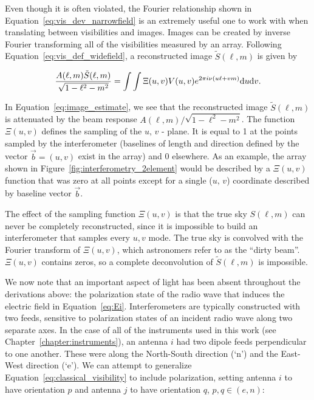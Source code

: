 Even though it is often violated, the Fourier relationship shown in Equation~\ref{eq:vis_dev_narrowfield} is an extremely useful one to work with when translating between visibilities and images. Images can be created by inverse Fourier transforming all of the visibilities measured by an array. Following Equation~\ref{eq:vis_def_widefield}, a reconstructed image $\tilde{S}(\ell, m)$ is given by

\begin{equation}
\frac{A(\ell, m)\tilde{S}(\ell, m)}{\sqrt{1 - \ell^2 - m^2}} = \int\int \Xi(u, v) V(u,v) e^{2\pi i \nu (u\ell + vm)} {\rm d}u {\rm d}v.
\label{eq:image_estimate}
\end{equation}

In Equation~\ref{eq:image_estimate}, we see that the reconstructed image $\tilde{S}(\ell, m)$ is attenuated by the beam response $A(\ell, m)/\sqrt{1 - \ell^2 - m^2}$. The function $\Xi(u, v)$ defines the sampling of the $u,\,v$ - plane. It is equal to 1 at the points sampled by the interferometer (baselines of length and direction defined by the vector  $\vec{b} = (u,v)$ exist in the array) and 0 elsewhere. As an example, the array shown in Figure~\ref{fig:interferometry_2element} would be described by a $\Xi(u, v)$ function that was zero at all points except for a single ($u,\,v$) coordinate described by baseline vector $\vec{b}$.

The effect of the sampling function $\Xi(u, v)$ is that the true sky $S(\ell,m)$ can never be completely reconstructed, since it is impossible to build an interferometer that samples every $u,v$ mode. The true sky is convolved with the Fourier transform of $\Xi(u, v)$, which astronomers refer to as the ``dirty beam''. $\Xi(u, v)$ contains zeros, so a complete deconvolution of $\tilde{S}(\ell, m)$ is impossible.

We now note that an important aspect of light has been absent throughout the derivations above: the polarization state of the radio wave that induces the electric field in Equation~\ref{eq:Ei}. Interferometers are typically constructed with two feeds, sensitive to polarization states of an incident radio wave along two separate axes. In the case of all of the instruments used in this work (see Chapter~\ref{chapter:instruments}), an antenna $i$ had two dipole feeds perpendicular to one another. These were along the North-South direction (`n') and the East-West direction (`e'). We can attempt to generalize Equation~\ref{eq:classical_visibility} to include polarization, setting antenna $i$ to have orientation $p$ and antenna $j$ to have orientation $q$, $p,q\in(e,n)$:

